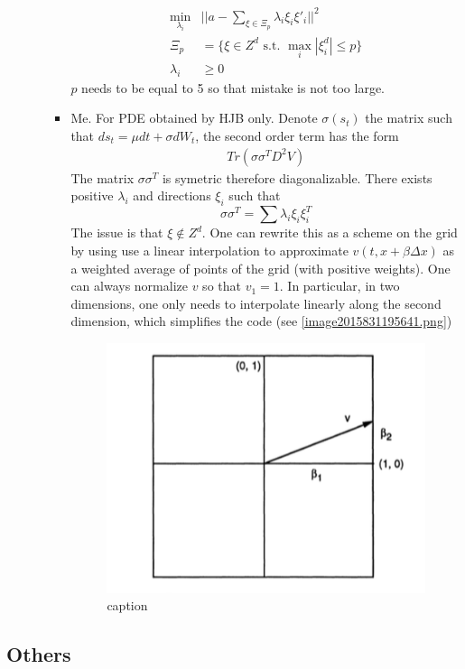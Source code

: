 \documentclass[english]{article}
\begin{document}
\begin{itemize}
\begin{itemize}
\begin{itemize}
\begin{align*}
				\min_{\lambda_i}&||a - \sum_{\xi \in \Xi_p} \lambda_i \xi_i \xi'_i||^2\\
				\Xi_p &= \{\xi \in Z^d \text{ s.t. }  \max_i|\xi_i^d| \leq p \}\\
				\lambda_i &\geq 0
			\end{align*}
			$p$ needs to be equal to 5 so that mistake is not too large.
			\item Me. For PDE obtained by HJB only. Denote $\sigma(s_t)$ the matrix such that $ds_t = \mu dt + \sigma dW_t$, the second order term has the form 
			\begin{align*}
				Tr(\sigma\sigma^TD^2V)
			\end{align*}
			The matrix $\sigma\sigma^T$ is symetric therefore diagonalizable. There exists positive $\lambda_i$ and directions $\xi_i$ such that
			$$\sigma\sigma^T = \sum \lambda_i \xi_i \xi_i^T$$ 
			The issue is that $\xi \notin Z^d$. One can rewrite this as a scheme on the grid by using use a linear interpolation to approximate $v(t, x+\beta \Delta x) $ as a weighted average of points of the grid (with positive weights). 
			One can always normalize $v$ so that $v_1 = 1$. In particular, in two dimensions, one only needs to interpolate linearly along the second dimension, which simplifies the code (see \autoref{image2015831195641.png})
			\begin{figure}[htp]
				\centering
				\includegraphics[width=4in]{image2015831195641.png}
				\caption{\label{image2015831195641.png}caption}
			\end{figure}
		\end{itemize}
	\end{itemize}
\end{itemize}

\subsection{Others}
\end{document}
